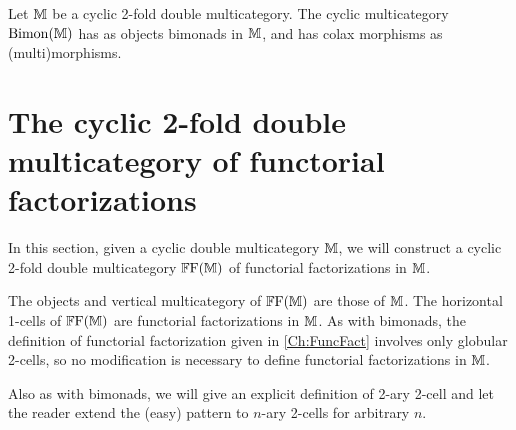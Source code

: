 \begin{definition}
	Let $\mathbb{M}$ be a cyclic 2-fold double multicategory. The cyclic multicategory $\mathrm{Bimon}(\mathbb{M})$ has as objects bimonads in $\mathbb{M}$, and has colax morphisms as (multi)morphisms.
\end{definition}

\section{The cyclic 2-fold double multicategory of functorial factorizations}

In this section, given a cyclic double multicategory $\mathbb{M}$, we will construct a cyclic 2-fold double multicategory $\mathbb{F}\mathrm{F}(\mathbb{M})$ of functorial factorizations in $\mathbb{M}$.

The objects and vertical multicategory of $\mathbb{F}\mathrm{F}(\mathbb{M})$ are those of $\mathbb{M}$. The horizontal 1-cells of $\mathbb{F}\mathrm{F}(\mathbb{M})$ are functorial factorizations in $\mathbb{M}$. As with bimonads, the definition of functorial factorization given in \cref{Ch:FuncFact} involves only globular 2-cells, so no modification is necessary to define functorial factorizations in $\mathbb{M}$.

Also as with bimonads, we will give an explicit definition of 2-ary 2-cell and let the reader extend the (easy) pattern to $n$-ary 2-cells for arbitrary $n$.

